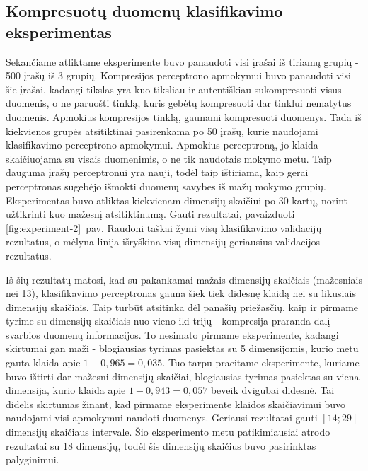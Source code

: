 \documentclass{VUMIFPSbakalaurinis}
\begin{document}
\subsection{Kompresuotų duomenų klasifikavimo eksperimentas}

Sekančiame atliktame eksperimente buvo panaudoti visi įrašai iš tiriamų grupių - 500 įrašų iš 3 grupių.
Kompresijos perceptrono apmokymui buvo panaudoti visi šie įrašai, kadangi tikslas yra kuo tiksliau ir autentiškiau sukompresuoti visus duomenis, o ne paruošti tinklą, kuris gebėtų kompresuoti dar tinklui nematytus duomenis.
Apmokius kompresijos tinklą, gaunami kompresuoti duomenys.
Tada iš kiekvienos grupės atsitiktinai pasirenkama po 50 įrašų, kurie naudojami klasifikavimo perceptrono apmokymui.
Apmokius perceptroną, jo klaida skaičiuojama su visais duomenimis, o ne tik naudotais mokymo metu.
Taip dauguma įrašų perceptronui yra nauji, todėl taip ištiriama, kaip gerai perceptronas sugebėjo išmokti duomenų savybes iš mažų mokymo grupių.
Eksperimentas buvo atliktas kiekvienam dimensijų skaičiui po 30 kartų, norint užtikrinti kuo mažesnį atsitiktinumą.
Gauti rezultatai, pavaizduoti \ref{fig:experiment-2}~pav.
Raudoni taškai žymi visų klasifikavimo validacijų rezultatus, o mėlyna linija išryškina visų dimensijų geriausius validacijos rezultatus.

Iš šių rezultatų matosi, kad su pakankamai mažais dimensijų skaičiais (mažesniais nei 13), klasifikavimo perceptronas gauna šiek tiek didesnę klaidą nei su likusiais dimensijų skaičiais.
Taip turbūt atsitinka dėl panašių priežasčių, kaip ir pirmame tyrime su dimensijų skaičiais nuo vieno iki trijų - kompresija praranda dalį svarbios duomenų informacijos.
To nesimato pirmame eksperimente, kadangi skirtumai gan maži - blogiausias tyrimas pasiektas su 5 dimensijomis, kurio metu gauta klaida apie $1 - 0,965 = 0,035$.
Tuo tarpu praeitame eksperimente, kuriame buvo ištirti dar mažesni dimensijų skaičiai, blogiausias tyrimas pasiektas su viena dimensija, kurio klaida apie $1 - 0,943 = 0,057$ beveik dvigubai didesnė.
Tai didelis skirtumas žinant, kad pirmame eksperimente klaidos skaičiavimui buvo naudojami visi apmokymui naudoti duomenys.
Geriausi rezultatai gauti $[14; 29]$ dimensijų skaičiaus intervale.
Šio eksperimento metu patikimiausiai atrodo rezultatai su 18 dimensijų, todėl šis dimensijų skaičius buvo pasirinktas palyginimui.
\end{document}
